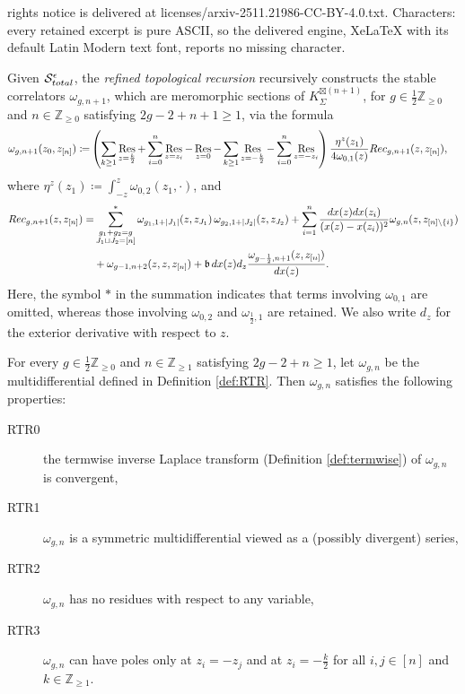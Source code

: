 \documentclass[10pt,a4paper]{amsart}
\DeclareMathOperator*{\Res}{Res}
\begin{document}
rights notice is delivered at licenses/arxiv-2511.21986-CC-BY-4.0.txt. Characters: every retained excerpt is pure ASCII, so the delivered engine, XeLaTeX with its default Latin Modern text font, reports no missing character.
\begin{definition}\label{def:RTR}
Given $\mathcal{S}^{\epsilon}_{\textup{total}}$, the \emph{refined topological recursion} recursively constructs the stable correlators $\omega_{g,n+1}$, which are meromorphic sections of $K_\Sigma^{\boxtimes (n+1)}$, for $g\in\frac12\mathbb{Z}_{\geq0}$ and $n\in\mathbb{Z}_{\geq0}$ satisfying $2g-2+n+1\geq1$, via the formula
\begin{align}
\omega_{g,n+1}(z_0,z_{[n]})\coloneqq&\left(\sum_{k\geq1}\Res_{z=\frac{k}{2}}+\sum_{i=0}^n\Res_{z=z_i}-\Res_{z=0}-\sum_{k\geq1}\Res_{z=-\frac{k}{2}}-\sum_{i=0}^n\Res_{z=-z_i}\right)\frac{\eta^z(z_1)}{4\omega_{0,1}(z)}{\rm Rec}_{g,n+1}(z,z_{[n]}),\label{RTR}
\end{align}
where $\eta^z(z_1)\coloneqq\int_{-z}^z\omega_{0,2}(z_1,\cdot)$, and
\begin{align}
{\rm Rec}_{g,n+1}(z,z_{[n]})=&\sum_{\substack{g_1+g_2=g\\J_1\sqcup J_2=[n]}}^*\omega_{g_1,1+|J_1|}(z,z_{J_1})\,\omega_{g_2,1+|J_2|}(z,z_{J_2})+\sum_{i=1}^n\frac{dx(z)dx(z_i)}{(x(z)-x(z_i))^2}\omega_{g,n}(z,z_{[n]\backslash\{i\}})\nonumber\\
&+\omega_{g-1,n+2}(z,z,z_{[n]})+\mathfrak{b}\,dx(z)d_z\frac{\omega_{g-\frac12,n+1}(z,z_{[n]})}{dx(z)}.\label{Rec}
\end{align}
Here, the symbol $*$ in the summation indicates that terms involving $\omega_{0,1}$ are omitted, whereas those involving $\omega_{0,2}$ and $\omega_{\frac12,1}$ are retained. We also write $d_z$ for the exterior derivative with respect to $z$.
\end{definition}

\begin{conjecture}\label{conj:RTR}
   For every $g\in\frac12\mathbb{Z}_{\geq0}$ and $n\in\mathbb{Z}_{\geq1}$ satisfying $2g-2+n\geq1$, let $\omega_{g,n}$ be the multidifferential defined in {\rm Definition \ref{def:RTR}}. Then $\omega_{g,n}$ satisfies the following properties:
    \begin{description}
     \item[{\rm RTR0}] \label{item:RTR0} the termwise inverse Laplace transform \textup{(Definition \ref{def:termwise})} of $\omega_{g,n}$ is convergent,
       \item[{\rm RTR1}] \label{item:RTR1}$\omega_{g,n}$ is a symmetric multidifferential viewed as a (possibly divergent) series,
       \item[{\rm RTR2}] \label{item:RTR2}$\omega_{g,n}$ has no residues with respect to any variable,
       \item[{\rm RTR3}] \label{item:RTR3}$\omega_{g,n}$ can have poles only at $z_i=-z_j$ and at $z_i=-\frac{k}{2}$ for all $i,j\in[n]$ and $k\in\mathbb{Z}_{\geq1}$.
   \end{description}
\end{conjecture}
\end{document}
